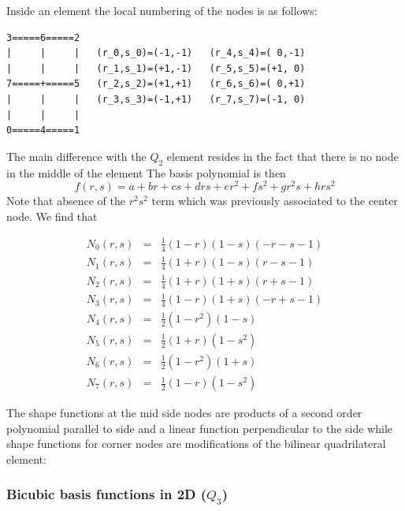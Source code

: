 Inside an element the local numbering of the nodes is as follows:
\begin{verbatim}
3=====6=====2
|     |     |   (r_0,s_0)=(-1,-1)   (r_4,s_4)=( 0,-1)
|     |     |   (r_1,s_1)=(+1,-1)   (r_5,s_5)=(+1, 0)
7=====+=====5   (r_2,s_2)=(+1,+1)   (r_6,s_6)=( 0,+1)
|     |     |   (r_3,s_3)=(-1,+1)   (r_7,s_7)=(-1, 0)
|     |     |    
0=====4=====1
\end{verbatim}
The main difference with the $Q_2$ element resides in the fact that there is 
no node in the middle of the element
The basis polynomial is then
\[
f(r,s) = a + br + cs + drs + er^2 + fs^2 + gr^2s + hrs^2
\]
Note that absence of the $r^2s^2$ term which was previously associated 
to the center node. We find that 
\begin{mdframed}[backgroundcolor=blue!5]
\begin{eqnarray}
N_0(r,s)&=& \frac{1}{4}(1-r)(1-s)(-r-s-1) \\
N_1(r,s)&=& \frac{1}{4}(1+r)(1-s)(r-s-1) \\
N_2(r,s)&=& \frac{1}{4}(1+r)(1+s)(r+s-1) \\
N_3(r,s)&=& \frac{1}{4}(1-r)(1+s)(-r+s-1) \\
N_4(r,s)&=& \frac{1}{2}(1-r^2)(1-s)  \\
N_5(r,s)&=& \frac{1}{2}(1+r)  (1-s^2)\\
N_6(r,s)&=& \frac{1}{2}(1-r^2)(1+s)  \\
N_7(r,s)&=& \frac{1}{2}(1-r)  (1-s^2)
\end{eqnarray}
\end{mdframed}

The shape functions at the mid side nodes are products of a 
second order polynomial parallel to side and 
a linear function perpendicular to the side
while shape functions for corner nodes are modifications of the bilinear
quadrilateral element:






















\subsubsection{Bicubic basis functions in 2D ($Q_3$)}

